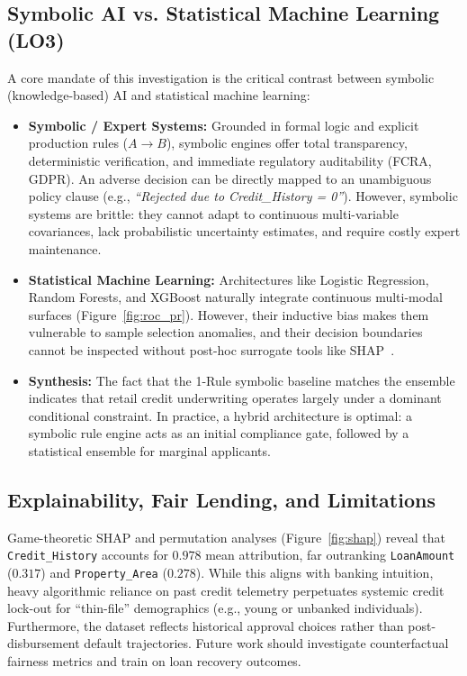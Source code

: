 \documentclass{COMPXXXX}
\begin{document}
\subsection{Symbolic AI vs. Statistical Machine Learning (LO3)}
A core mandate of this investigation is the critical contrast between symbolic (knowledge-based) AI and statistical machine learning:
\begin{itemize}
    \item \textbf{Symbolic / Expert Systems:} Grounded in formal logic and explicit production rules ($A \to B$), symbolic engines offer total transparency, deterministic verification, and immediate regulatory auditability (FCRA, GDPR). An adverse decision can be directly mapped to an unambiguous policy clause (e.g., \textit{``Rejected due to Credit\_History = 0''}). However, symbolic systems are brittle: they cannot adapt to continuous multi-variable covariances, lack probabilistic uncertainty estimates, and require costly expert maintenance.
    \item \textbf{Statistical Machine Learning:} Architectures like Logistic Regression, Random Forests, and XGBoost naturally integrate continuous multi-modal surfaces (Figure~\ref{fig:roc_pr}). However, their inductive bias makes them vulnerable to sample selection anomalies, and their decision boundaries cannot be inspected without post-hoc surrogate tools like SHAP~\cite{lundberg2017}.
    \item \textbf{Synthesis:} The fact that the 1-Rule symbolic baseline matches the ensemble indicates that retail credit underwriting operates largely under a dominant conditional constraint. In practice, a hybrid architecture is optimal: a symbolic rule engine acts as an initial compliance gate, followed by a statistical ensemble for marginal applicants.
\end{itemize}

\subsection{Explainability, Fair Lending, and Limitations}
Game-theoretic SHAP and permutation analyses (Figure~\ref{fig:shap}) reveal that \texttt{Credit\_History} accounts for $0.978$ mean attribution, far outranking \texttt{LoanAmount} ($0.317$) and \texttt{Property\_Area} ($0.278$). While this aligns with banking intuition, heavy algorithmic reliance on past credit telemetry perpetuates systemic credit lock-out for ``thin-file'' demographics (e.g., young or unbanked individuals). Furthermore, the dataset reflects historical approval choices rather than post-disbursement default trajectories. Future work should investigate counterfactual fairness metrics and train on loan recovery outcomes.
\end{document}
